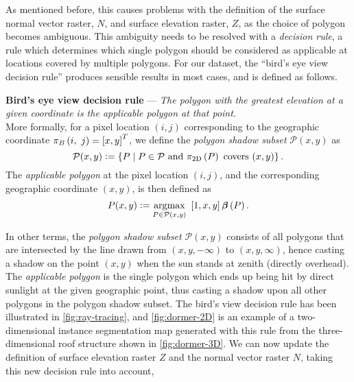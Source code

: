 As mentioned before, this causes problems with the definition of the surface normal vector raster, $N$, and surface elevation raster, $Z$, as the choice of polygon becomes ambiguous.
This ambiguity needs to be resolved with a \textit{decision rule}, a rule which determines which single polygon should be considered as applicable at locations covered by multiple polygons.
For our dataset, the \enquote{bird's eye view decision rule} produces sensible results in most cases, and is defined as follows.
%
\begin{framed}
  \noindent
  \textbf{Bird's eye view decision rule}
  ---
  \textit{The polygon with the greatest elevation at a given coordinate is the applicable polygon at that point.}
  \\
  More formally, for a pixel location $(i, j)$ corresponding to the geographic coordinate $\pi_{B}\left(i,~j\right) = {[x, y]}^T$, we define the \textit{polygon shadow subset} $\mathcal{P}(x, y)$ as
  \begin{equation*}
    \mathcal{P}(x, y)
    \vcentcolon=
    \left\{
      P
      \mid
      P \in \mathcal{P}
      \text{ and }
      \pi_{\mathrm{2D}}\left(P\right) \text{ covers } (x, y)
    \right\}.
  \end{equation*}
  The \textit{applicable polygon} at the pixel location $(i, j)$, and the corresponding geographic coordinate $(x, y)$, is then defined as
  \begin{equation*}
    P(x, y)
    \vcentcolon=
    \operatorname*{\arg\!\max}_{P \in \mathcal{P}(x, y)}~
    \left[1, x, y\right] \boldsymbol{\beta}\left(P\right).
  \end{equation*}
  \vspace{-1.5em}
\end{framed}
%
In other terms, the \textit{polygon shadow subset} $\mathcal{P}(x, y)$ consists of all polygons that are intersected by the line drawn from $(x, y, -\infty)$ to $(x, y, \infty)$, hence casting a shadow on the point $(x, y)$ when the sun stands at zenith (directly overhead).
The \textit{applicable polygon} is the single polygon which ends up being hit by direct sunlight at the given geographic point, thus casting a shadow upon all other polygons in the polygon shadow subset.
The bird's view decision rule has been illustrated in \cref{fig:ray-tracing}, and \cref{fig:dormer-2D} is an example of a two-dimensional instance segmentation map generated with this rule from the three-dimensional roof structure shown in \cref{fig:dormer-3D}.
We can now update the definition of surface elevation raster $Z$ and the normal vector raster $N$, taking this new decision rule into account,
